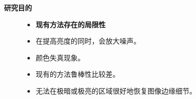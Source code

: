 \documentclass[CJK,aspectratio=169]{beamer}  %
\begin{document}
	\begin{frame}
		{ \yahei \textbf{研究目的}}
		
		\begin{figure}
		\begin{minipage}{.35\columnwidth}
			\begin{itemize}
				\item {} \yahei \textbf{现有方法存在的局限性}
				
				\item[\XSolidBrush]
				 \yahei 在提高亮度的同时，会放大噪声。
				
				\item[\XSolidBrush]
				 \yahei 颜色失真现象。
				
				\item[\XSolidBrush]
				 \yahei 现有的方法鲁棒性比较差。
				\item[\XSolidBrush]
				 \yahei 无法在极暗或极亮的区域很好地恢复图像边缘细节\textcolor{blue}{\citep{xu2023low}}。
				
				\vspace{0.2cm}
				

\end{itemize}
\end{minipage}
\end{figure}
\end{frame}
\end{document}
